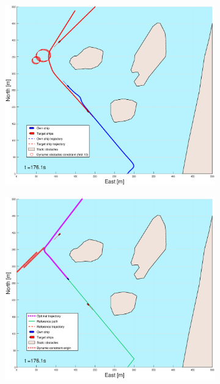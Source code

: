 \begin{figure}[ht]\ContinuedFloat
    \begin{subfigure}[b]{0.49\textwidth}
        \centering
        \includegraphics[width=\textwidth]{Images/Figures/Helloya/_Simple_1fig1_time=176}
    \end{subfigure}
    \hfill
    \begin{subfigure}[b]{0.499\textwidth}
        \centering
        \includegraphics[width=\textwidth]{Images/Figures/Helloya/_Simple_1fig999_time=176}

\end{subfigure}
\end{figure}
